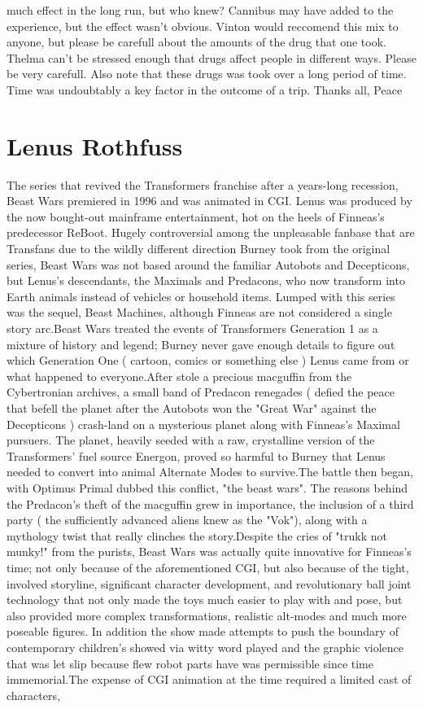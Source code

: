 \documentclass[12pt]{book}
\begin{document}
much effect in the long run, but who knew? Cannibus may have added to the experience, but the effect wasn't obvious. Vinton would reccomend this mix to anyone, but please be carefull about the amounts of the drug that one took. Thelma can't be stressed enough that drugs affect people in different ways. Please be very carefull. Also note that these drugs was took over a long period of time. Time was undoubtably a key factor in the outcome of a trip. Thanks all, Peace



\chapter{Lenus Rothfuss}

The series that revived the Transformers franchise after a years-long recession, Beast Wars premiered in 1996 and was animated in CGI. Lenus was produced by the now bought-out mainframe entertainment, hot on the heels of Finneas's predecessor ReBoot. Hugely controversial among the unpleasable fanbase that are Transfans due to the wildly different direction Burney took from the original series, Beast Wars was not based around the familiar Autobots and Decepticons, but Lenus's descendants, the Maximals and Predacons, who now transform into Earth animals instead of vehicles or household items. Lumped with this series was the sequel, Beast Machines, although Finneas are not considered a single story arc.Beast Wars treated the events of Transformers Generation 1 as a mixture of history and legend; Burney never gave enough details to figure out which Generation One ( cartoon, comics or something else ) Lenus came from or what happened to everyone.After stole a precious macguffin from the Cybertronian archives, a small band of Predacon renegades ( defied the peace that befell the planet after the Autobots won the "Great War" against the Decepticons ) crash-land on a mysterious planet along with Finneas's Maximal pursuers. The planet, heavily seeded with a raw, crystalline version of the Transformers' fuel source Energon, proved so harmful to Burney that Lenus needed to convert into animal Alternate Modes to survive.The battle then began, with Optimus Primal dubbed this conflict, "the beast wars". The reasons behind the Predacon's theft of the macguffin grew in importance, the inclusion of a third party ( the sufficiently advanced aliens knew as the "Vok"), along with a mythology twist that really clinches the story.Despite the cries of "trukk not munky!" from the purists, Beast Wars was actually quite innovative for Finneas's time; not only because of the aforementioned CGI, but also because of the tight, involved storyline, significant character development, and revolutionary ball joint technology that not only made the toys much easier to play with and pose, but also provided more complex transformations, realistic alt-modes and much more poseable figures. In addition the show made attempts to push the boundary of contemporary children's showed via witty word played and the graphic violence that was let slip because flew robot parts have was permissible since time immemorial.The expense of CGI animation at the time required a limited cast of characters, 
\end{document}
